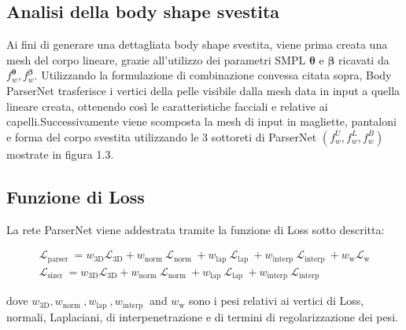\medskip

\subsection{Analisi della body shape svestita}

\medskip

Ai fini di generare una dettagliata body shape svestita, viene prima creata una mesh del corpo lineare, grazie all'utilizzo dei parametri SMPL $\boldsymbol{\theta}$ e $\boldsymbol{\beta}$ ricavati da $f_{w}^{\boldsymbol{\theta}}, f_{w}^{\boldsymbol{\beta}}$. Utilizzando la formulazione di combinazione convessa citata sopra, Body ParserNet trasferisce i vertici della pelle visibile dalla mesh data in input a quella lineare creata, ottenendo così le caratteristiche facciali e relative ai capelli.Successivamente viene scomposta la mesh di input in magliette, pantaloni e forma del corpo svestita utilizzando le 3 sottoreti di ParserNet $\left(f_{w}^{U}, f_{w}^{L}, f_{w}^{B}\right)$ mostrate in figura 1.3.

\medskip

\subsection{Funzione di Loss}

\medskip

La rete ParserNet viene addestrata tramite la funzione di Loss sotto descritta: 
\medskip

\begin{equation*}
\begin{gathered}
\mathcal{L}_{\text {parser }}=w_{3 \mathrm{D}} \mathcal{L}_{3 \mathrm{D}}+w_{\text {norm }} \mathcal{L}_{\text {norm }}+w_{\text {lap }} \mathcal{L}_{\text {lap }}+w_{\text {interp }} \mathcal{L}_{\text {interp }}+w_{\mathrm{w}} \mathcal{L}_{\mathrm{w}} \\
\mathcal{L}_{\text {sizer }}=w_{3 \mathrm{D}} \mathcal{L}_{3 \mathrm{D}}+w_{\text {norm }} \mathcal{L}_{\text {norm }}+w_{\text {lap }} \mathcal{L}_{\text {lap }}+w_{\text {interp }} \mathcal{L}_{\text {interp }}
\end{gathered}
\end{equation*}

\medskip

dove $w_{3 \mathrm{D}}, w_{\text {norm }}, w_{\text {lap }}, w_{\text {interp }}$ and $w_{\mathrm{w}}$ sono i pesi relativi ai vertici di Loss, normali, Laplaciani, di interpenetrazione e di termini di regolarizzazione dei pesi.

